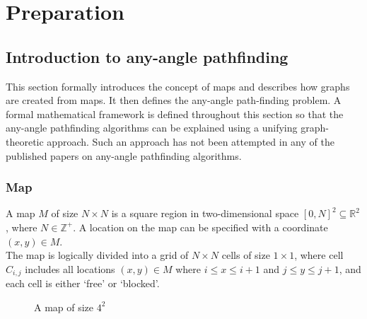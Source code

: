 \documentclass[12pt,notitlepage]{report}
\begin{document}
\cleardoublepage


\chapter{Preparation} 

\section{Introduction to any-angle pathfinding}

This section formally introduces the concept of maps and describes how graphs are created from maps. It then defines the any-angle path-finding problem. A formal mathematical framework is defined throughout this section so that the any-angle pathfinding algorithms can be explained using a unifying graph-theoretic approach. Such an approach has not been attempted in any of the published papers on any-angle pathfinding algorithms.

\subsection{Map}

A map $M$ of size $N \times N$ is a square region in two-dimensional space $[0,N]^{2} \subseteq \mathbb{R}^{2}$, where $N \in\mathbb{Z^+}$. A location on the map can be specified with a coordinate $(x,y) \in M$.\\

\noindent
The map is logically divided into a grid of $N \times N$ cells of size $1 \times 1$, where cell $C_{i,j}$ includes all locations $(x,y) \in M$ where $i \leq x \leq i+1$ and $j \leq y \leq j+1$, and each cell is either `free' or `blocked'.\\

\begin{figure}
\centering
  \caption{A map of size $4^{2}$}
\end{figure}
\end{document}
